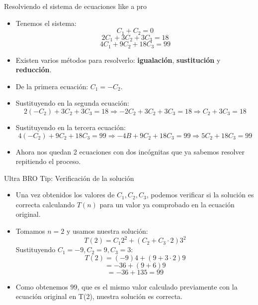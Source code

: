 \documentclass[aspectratio=169]{beamer}
\begin{document}
\begin{frame}{Resolviendo el sistema de ecuaciones like a pro}
\begin{itemize}
    \item Tenemos el sistema:
    \[
    C_1 + C_2 = 0
    \]
    \[
    2C_1 + 3C_2 + 3C_3 = 18
    \]
    \[
    4C_1 + 9C_2 + 18C_3 = 99
    \]
    
    \item Existen varios métodos para resolverlo: \textbf{igualación}, \textbf{sustitución} y \textbf{reducción}.
    
    \item De la primera ecuación: \( C_1 = -C_2 \).
    
    \item Sustituyendo en la segunda ecuación:
    \[
    2(-C_2) + 3C_2 + 3C_3 = 18 \Rightarrow -2C_2 + 3C_2 + 3C_3 = 18 \Rightarrow C_2 + 3C_3 = 18
    \]
    
    \item Sustituyendo en la tercera ecuación:
    \[
    4(-C_2) + 9C_2 + 18C_3 = 99 \Rightarrow -4B + 9C_2 + 18C_3 = 99 \Rightarrow 5C_2 + 18C_3 = 99
    \]
    
    \item Ahora nos quedan 2 ecuaciones con dos incógnitas que ya sabemos resolver repitiendo el proceso.
\end{itemize}
\end{frame}


\begin{frame}{Ultra BRO Tip: Verificación de la solución}
\begin{itemize}
    \item Una vez obtenidos los valores de \( C_1, C_2, C_3 \), podemos verificar si la solución es correcta calculando \( T(n) \) para un valor ya comprobado en la ecuación original.
    
    \item Tomamos \( n = 2 \) y usamos nuestra solución:
    \[
    T(2) = C_1 2^2 + (C_2 + C_3 \cdot 2) 3^2
    \]
    Sustituyendo \( C_1 = -9, C_2 = 9, C_3 = 3 \):
    \[
    T(2) = (-9) 4 + (9 + 3 \cdot 2) 9
    \]
    \[
    = -36 + (9 + 6) 9
    \]
    \[
    = -36 + 135 = 99
    \]
    
    \item Como obtenemos \( 99 \), que es el mismo valor calculado previamente con la ecuación original en T(2), nuestra solución es correcta.
\end{itemize}
\end{frame}
\end{document}
